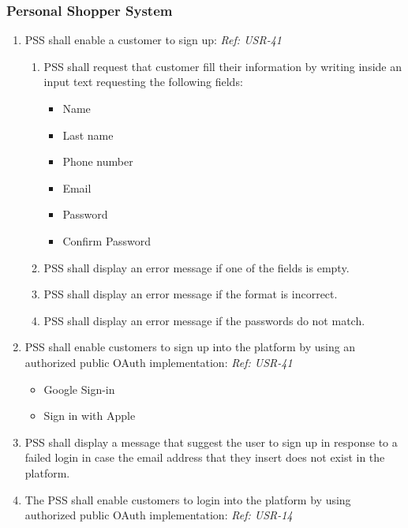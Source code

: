 \subsubsection{Personal Shopper System}
\begin{enumerate}[resume, label=SY-\arabic*]
    \item PSS shall enable a customer to sign up:
    \newline \textit{Ref: USR-41}
    \begin{enumerate}[label=SY-5.\arabic*]
        \item PSS shall request that customer fill their information by
        writing inside an input text requesting the following fields:
        \begin{itemize}
            \item Name
            \item Last name
            \item Phone number
            \item Email
            \item Password
            \item Confirm Password
        \end{itemize}
        \item PSS shall display an error message if one of the fields is empty.
        \item PSS shall display an error message if the format is incorrect.
        \item PSS shall display an error message if the passwords do not match.
    \end{enumerate}
    \item PSS shall enable customers to sign up into the platform by using an 
    authorized public OAuth implementation:
    \newline \textit{Ref: USR-41}
    \begin{itemize}
        \item Google Sign-in \cite{google-sign-in}
        \item Sign in with Apple \cite{sign-in-with-apple}
    \end{itemize}
    \item PSS shall display a message that suggest the user to sign up in
    response to a failed login in case the email address that they 
    insert does not exist in the platform.
    \item The PSS shall enable customers to login into the platform by using 
    authorized public OAuth implementation:
    \newline \textit{Ref: USR-14}

\end{enumerate}
